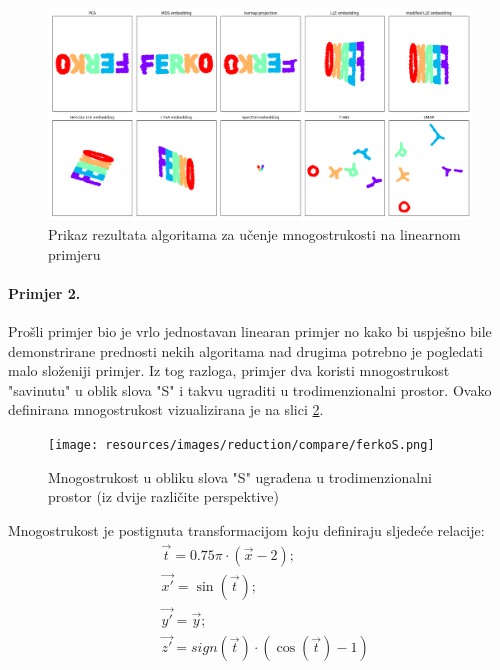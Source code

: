 \documentclass[times, utf8, diplomski]{fer}
\begin{document}
\begin{figure}[htb]
    \centering
    \includegraphics[width=\textwidth]{resources/images/reduction/compare/x3d.png}
    \caption{Prikaz rezultata algoritama za učenje mnogostrukosti na linearnom primjeru}
    \label{fig:x3d}
\end{figure}

\paragraph{Primjer 2.} Prošli primjer bio je vrlo jednostavan linearan primjer no kako bi uspješno bile demonstrirane prednosti nekih algoritama nad drugima potrebno je pogledati malo složeniji primjer. Iz tog razloga, primjer dva koristi mnogostrukost "savinutu" u oblik slova "S" i takvu ugraditi u trodimenzionalni prostor. Ovako definirana mnogostrukost vizualizirana je na slici \ref{fig:ferkoS}.

\begin{figure}[htb]
    \centering
    \texttt{[image: resources/images/reduction/compare/ferkoS.png]}
    \caption{Mnogostrukost u obliku slova "S" ugrađena u trodimenzionalni prostor (iz dvije različite perspektive)}
    \label{fig:ferkoS}
\end{figure}

Mnogostrukost je postignuta transformacijom koju definiraju sljedeće relacije:
\begin{align}
     & \vec{t} = 0.75 \pi \cdot (\vec{x} - 2);
    \\
     & \vec{x'} = \sin(\vec{t});
    \\%
     & \vec{y'} = \vec{y};
    \\%
     & \vec{z'} = sign(\vec{t}) \cdot (\cos(\vec{t}) - 1)
    \label{eq:makeS}
\end{align}
\end{document}
